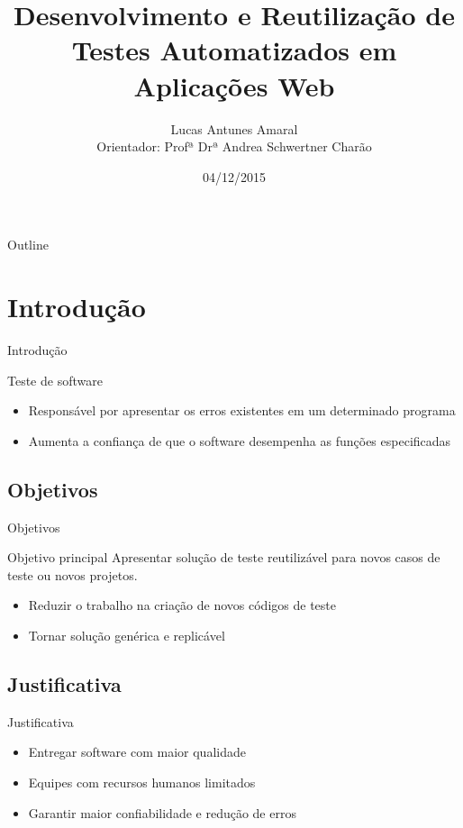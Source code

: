 \documentclass{beamer}
\title{Desenvolvimento e Reutilização de Testes Automatizados em Aplicações Web}
\author[Lucas Antunes Amaral]{Lucas Antunes Amaral\\Orientador: Profª Drª Andrea Schwertner Charão}
\institute[UFSM]{Ciência da Computação\\Universidade Federal de Santa Maria}
\date{04/12/2015}
\begin{document}
\begin{frame}
	\titlepage
\end{frame}

\begin{frame}{Outline}
  \tableofcontents
\end{frame}

\section{Introdução}
\begin{frame}{Introdução}
	\begin{block}{Teste de software}

	\end{block}
	\begin{itemize}
		\item Responsável por apresentar os erros existentes em um determinado programa
		\item Aumenta a confiança de que o software desempenha as funções especificadas
	\end{itemize}
\end{frame}

\subsection{Objetivos}
\begin{frame}{Objetivos}
    \begin{block}{Objetivo principal}
	    Apresentar solução de teste reutilizável para novos casos de teste ou novos projetos.
	\end{block}
	\begin{itemize}
		\item Reduzir o trabalho na criação de novos códigos de teste
		\item Tornar solução genérica e replicável
	\end{itemize}
\end{frame}

\subsection{Justificativa}
\begin{frame}{Justificativa}
	\begin{itemize}
		\item Entregar software com maior qualidade
		\item Equipes com recursos humanos limitados
		\item Garantir maior confiabilidade e redução de erros
	\end{itemize}
\end{frame}
\end{document}
